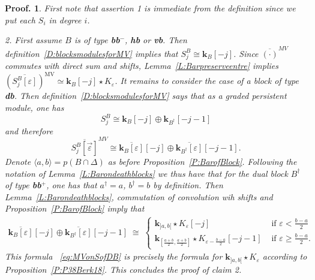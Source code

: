 \documentclass[a4paper, english, 11pt]{article}
\newcommand{\kk}[0]{\textbf{k}}
\newcommand{\0}{\vec{0}}
\newcommand{\MV}{\text{MV}}
\newtheorem*{pf}{Proof.} }
\begin{document}
\begin{pf}
First note that assertion 1 is immediate from the definition since we put each $S_i$ in degree $i$.   


\smallskip 

2. First assume $B$ is of type  \textbf{bb$^-$}, \textbf{hb} or \textbf{vb}. Then  definition~\ref{D:blocksmodulesforMV} implies that $S_j^B \cong \kk_B[-j]$. Since  $\overline{(\cdot)}^{MV}$ commutes with direct 
sum and shifts, Lemma~\ref{L:Barpreserveentre} implies $(\overline{S_j^B [\varepsilon]})^{\MV} \simeq \kk_B[-j] \star K_\varepsilon $. It remains to consider the case of a block of type \textbf{db}. Then definition~\ref{D:blocksmodulesforMV} says that as a graded persistent module, one has $$S_j^B \cong \kk_B[-j] \oplus \kk_{B^\dagger}[-j-1]$$ and therefore  $$\overline{S_j^B[\vec{\varepsilon}]}^{MV} \cong \overline{\kk_B[\varepsilon]}[-j] \oplus \overline{\kk_{B^\dagger}[\varepsilon]}[-j-1].$$ Denote $\langle a, b\rangle =p(B \cap \Delta)$ as before Proposition~\ref{P:BarofBlock}. Following the notation of 
Lemma~\ref{L:Barondeathblocks} we thus have that for the dual block $B^\dagger$ of type \textbf{bb}$^{+}$, one has that $a^\dagger=a$, $b^\dagger=b$ by definition. Then Lemma~\ref{L:Barondeathblocks}, commutation of convolution wih shifts and Proposition~\ref{P:BarofBlock} imply that 
\begin{multline}\label{eq:MVonSofDB}
\overline{\kk_B[\varepsilon]}[-j] \oplus \overline{\kk_{B^\dagger}[\varepsilon]}[-j-1] \;
  \cong \;\left\{ \begin{array}{ll}  \kk_{]a,b[}\star K_{\varepsilon}[-j] & \mbox{ if $\varepsilon< \frac{b-a}{2}$}\\
 \kk_{[\frac{a+b}{2}, \frac{a+b}{2}]}\star K_{\varepsilon -\frac{b -a}{2}} [-j-1] & \mbox{ if $\varepsilon \geqslant \frac{b-a}{2}$.} \end{array}   \right .
\end{multline}
This formula ~\eqref{eq:MVonSofDB} is precisely the formula for $\kk_{]a,b[}\star K_{\varepsilon}$ according to Proposition~\ref{P:P38Berk18}. This concludes the proof of claim 2.

\smallskip


\end{pf}
\end{document}
